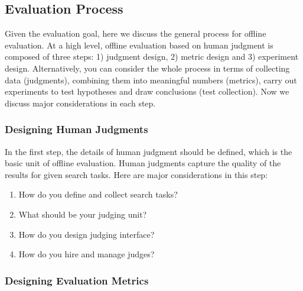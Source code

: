\subsection{Evaluation Process}
Given the evaluation goal, here we discuss the general process for offline evaluation. At a high level, offline evaluation based on human judgment is composed of three steps: 1) judgment design, 2) metric design and 3) experiment design. Alternatively, you can consider the whole process in terms of collecting data (judgments), combining them into meaningful numbers (metrics), carry out experiments to test hypotheses and draw conclusions (test collection). Now we discuss major considerations in each step.


\subsubsection{Designing Human Judgments}

In the first step, the details of human judgment should be defined, which is the basic unit of offline evaluation. Human judgments capture the quality of the results for given search tasks. Here are major considerations in this step:

\begin{enumerate}
	\item How do you define and collect search tasks?
	\item What should be your judging unit?
	\item How do you design judging interface?
	\item How do you hire and manage judges?%
\end{enumerate}

\subsubsection{Designing Evaluation Metrics}

